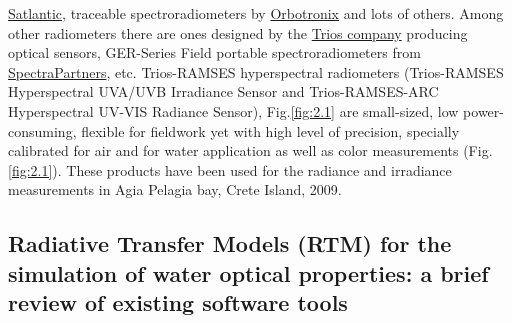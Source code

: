 \documentclass[11pt]{article}
\begin{document}
\href{http://www.satlantic.com}{Satlantic}, traceable spectroradiometers by \href{http://www.orboptronix.com}{Orbotronix} 
and lots of others. Among other radiometers there are ones designed by the \href{http://www.trios.de/}{Trios company} producing
optical sensors, GER-Series Field portable spectroradiometers from
\href{http://www.spectrapartners.nl/}{SpectraPartners}, etc. \ac{Trios-RAMSES} hyperspectral radiometers
(\ac{Trios-RAMSES} Hyperspectral \ac{UVA}/\ac{UVB} Irradiance Sensor and \ac{Trios-RAMSES}-ARC Hyperspectral \ac{UV}-\ac{VIS} Radiance Sensor), Fig.\ref{fig:2.1} are small-sized, low power-consuming, flexible for fieldwork yet with high
level of precision, specially calibrated for air and for water application as well as color
measurements  (Fig.\ref{fig:2.1})\label{page-13}. These products have been used for the radiance and irradiance
measurements in Agia Pelagia bay, Crete Island, 2009.


\subsection[Radiative Transfer Models (RTM) for the simulation of water optical properties: a brief review of existing software tools]{Radiative Transfer Models (RTM) for the simulation of water optical properties: a brief review of existing software tools%
}
\label{sec:2-3}
\end{document}
